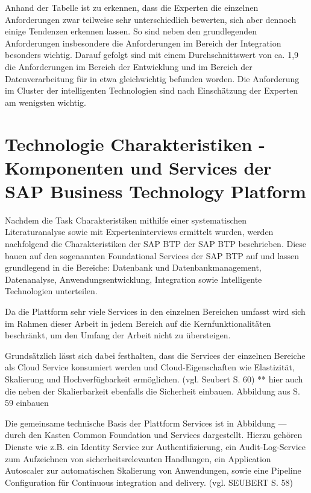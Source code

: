Anhand der Tabelle ist zu erkennen, dass die Experten die einzelnen Anforderungen zwar teilweise sehr unterschiedlich bewerten, sich aber dennoch einige Tendenzen erkennen lassen. So sind neben den grundlegenden Anforderungen insbesondere die Anforderungen im Bereich der Integration besonders wichtig. Darauf gefolgt sind mit einem Durchschnittswert von ca. 1,9 die Anforderungen im Bereich der Entwicklung und im Bereich der Datenverarbeitung für in etwa gleichwichtig befunden worden. Die Anforderung im Cluster der intelligenten Technologien sind nach Einschätzung der Experten am wenigsten wichtig.















\section{Technologie Charakteristiken - Komponenten und Services der SAP Business Technology Platform}\label{sec:TechCharak}

Nachdem die Task Charakteristiken mithilfe einer systematischen Literaturanalyse sowie mit Experteninterviews ermittelt wurden, werden nachfolgend die Charakteristiken der SAP BTP  der SAP BTP beschrieben.  Diese bauen auf den sogenannten Foundational Services der SAP BTP auf und lassen grundlegend in die Bereiche: Datenbank und Datenbankmanagement, Datenanalyse, Anwendungsentwicklung, Integration sowie Intelligente Technologien unterteilen.

Da die Plattform sehr viele Services in den einzelnen Bereichen umfasst wird sich im Rahmen dieser Arbeit in jedem Bereich auf die Kernfunktionalitäten beschränkt, um den Umfang der Arbeit nicht zu übersteigen.

Grundsätzlich lässt sich dabei festhalten, dass die Services der einzelnen Bereiche als Cloud Service konsumiert werden und Cloud-Eigenschaften wie Elastizität, Skalierung und Hochverfügbarkeit ermöglichen. (vgl. Seubert S. 60)
** hier auch die neben der Skalierbarkeit ebenfalls die Sicherheit einbauen.
Abbildung aus S. 59 einbauen

Die gemeinsame technische Basis der Plattform Services ist in Abbildung --- durch den Kasten Common Foundation und Services dargestellt. Hierzu gehören Dienste wie z.B. ein Identity Service zur Authentifizierung, ein Audit-Log-Service zum Aufzeichnen von sicherheitsrelevanten Handlungen, ein Application Autoscaler zur automatischen Skalierung von Anwendungen, sowie eine Pipeline Configuration für Continuous integration and delivery. (vgl. SEUBERT S. 58)

